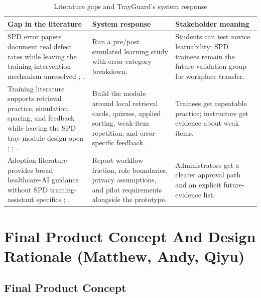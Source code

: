 \documentclass[10pt,a4paper]{article}
\begin{document}
\begin{table}[H]
\centering
\caption{Literature gaps and TrayGuard's system response}
\label{tab:literature-gaps-and-system-response}
\small\renewcommand{\arraystretch}{1.2}\setlength{\tabcolsep}{4pt}
\begin{tabularx}{\textwidth}{|>{\raggedright\arraybackslash}X|>{\raggedright\arraybackslash}X|>{\raggedright\arraybackslash}X|}
\hline
Gap in the literature & System response & Stakeholder meaning \\
\hline

SPD error papers document real defect rates while leaving the training-intervention mechanism unresolved \cite{alfred-et-al-2021}; \cite{nichol-et-al-2024}. & Run a pre/post simulated learning study with error-category breakdown. & Students can test novice learnability; SPD trainees remain the future validation group for workplace transfer. \\
\hline
Training literature supports retrieval practice, simulation, spacing, and feedback while leaving the SPD tray-module design open \cite{roediger-and-karpicke-2006}; \cite{cook-et-al-2011}; \cite{ofstead-et-al-2023}. & Build the module around local retrieval cards, quizzes, applied sorting, weak-item repetition, and error-specific feedback. & Trainees get repeatable practice; instructors get evidence about weak items. \\
\hline
Adoption literature provides broad healthcare-AI guidance without SPD training-assistant specifics \cite{goddard-et-al-2012}; \cite{kelly-2026}. & Report workflow friction, role boundaries, privacy assumptions, and pilot requirements alongside the prototype. & Administrators get a clearer approval path and an explicit future-evidence list. \\
\hline
\end{tabularx}
\end{table}




\section{Final Product Concept And Design Rationale \hfill {\normalfont\small (Matthew, Andy, Qiyu)}}
\label{sec:final-product-concept-and-design-rationale}
\subsection{Final Product Concept}
\end{document}
